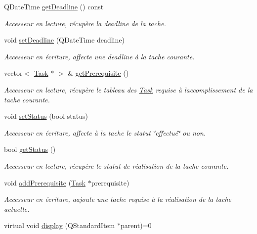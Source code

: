 \begin{DoxyCompactItemize}
Q\+Date\+Time \hyperlink{class_task_a876d5bcfaf94fc3e7beda829a9a07bcc}{get\+Deadline} () const 
\begin{DoxyCompactList}\small\item\em Accesseur en lecture, récupère la deadline de la tache. \end{DoxyCompactList}\item 
void \hyperlink{class_task_a55c6d95a49a1e9af2c08ab3f3531b04e}{set\+Deadline} (Q\+Date\+Time deadline)
\begin{DoxyCompactList}\small\item\em Accesseur en écriture, affecte une deadline à la tache courante. \end{DoxyCompactList}\item 
vector$<$ \hyperlink{class_task}{Task} $\ast$ $>$ \& \hyperlink{class_task_ae45552bcf7902c4bb22e108fed9b8c95}{get\+Prerequisite} ()
\begin{DoxyCompactList}\small\item\em Accesseur en lecture, récupère le tableau des \hyperlink{class_task}{Task} requise à l\textquotesingle{}accomplissement de la tache courante. \end{DoxyCompactList}\item 
void \hyperlink{class_task_a47743716efa458dc1ed004d598ed7184}{set\+Status} (bool status)
\begin{DoxyCompactList}\small\item\em Accesseur en écriture, affecte à la tache le statut \char`\"{}effectué\char`\"{} ou non. \end{DoxyCompactList}\item 
bool \hyperlink{class_task_a87f84f68d49f57f5f5bce9ec08854f1c}{get\+Status} ()
\begin{DoxyCompactList}\small\item\em Accesseur en lecture, récupère le statut de réalisation de la tache courante. \end{DoxyCompactList}\item 
void \hyperlink{class_task_a79a7113a964451027787407d988b2586}{add\+Prerequisite} (\hyperlink{class_task}{Task} $\ast$prerequisite)
\begin{DoxyCompactList}\small\item\em Accesseur en écriture, aajoute une tache requise à la réalisation de la tache actuelle. \end{DoxyCompactList}\item 
virtual void \hyperlink{class_task_a1634bc579750e601d5ab63fe3a7e8259}{display} (Q\+Standard\+Item $\ast$parent)=0

\end{DoxyCompactItemize}
